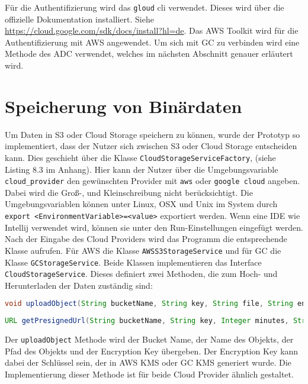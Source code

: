 Für die Authentifizierung wird das \verb|gloud| cli verwendet. Dieses wird über die offizielle Dokumentation installiert. Siehe \url{https://cloud.google.com/sdk/docs/install?hl=de}. Das AWS Toolkit wird für die Authentifizierung mit AWS angewendet. Um sich mit GC zu verbinden wird eine Methode des ADC verwendet, welches im nächsten Abschnitt genauer erläutert wird.

\newpage

\section{Speicherung von Binärdaten}

Um Daten in S3 oder Cloud Storage speichern zu können, wurde der Prototyp so implementiert, dass der Nutzer sich zwischen S3 oder Cloud Storage entscheiden kann. Dies geschieht über die Klasse \verb|CloudStorageServiceFactory|, (siehe Listing 8.3 im Anhang). Hier kann der Nutzer über die Umgebungsvariable \verb|cloud_provider| den gewünschten Provider mit \verb|aws| oder \verb|google cloud| angeben. Dabei wird die Groß-, und Kleinschreibung nicht berücksichtigt. Die Umgebungsvariablen können unter Linux, OSX und Unix im System durch \verb|export <EnvironmentVariable>=<value>| exportiert werden. Wenn eine IDE wie Intellij verwendet wird, können sie unter den Run-Einstellungen eingefügt werden. Nach der Eingabe des Cloud Providers wird das Programm die entsprechende Klasse aufrufen. Für AWS die Klasse \verb|AWSS3StorageService| und für GC die Klasse \verb|GCStorageService|. Beide Klassen implementieren das Interface \verb|CloudStorageService|. Dieses definiert zwei Methoden, die zum Hoch- und Herunterladen der Daten zuständig sind:

\begin{lstlisting}[language=Java]
void uploadObject(String bucketName, String key, String file, String encryptionKey, String storageClass) throws IOException;
\end{lstlisting}

\begin{lstlisting}[language=Java]
URL getPresignedUrl(String bucketName, String key, Integer minutes, String encryptionKey);
\end{lstlisting}
	
Der \verb|uploadObject| Methode wird der Bucket Name, der Name des Objekts, der Pfad des Objekts und der Encryption Key übergeben. Der Encryption Key kann dabei der Schlüssel sein, der in AWS KMS oder GC KMS generiert wurde. Die Implementierung dieser Methode ist für beide Cloud Provider ähnlich gestaltet.

